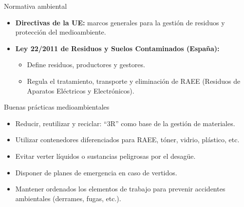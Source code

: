 \documentclass{beamer}
\begin{document}
\begin{frame}{Normativa ambiental}
    \begin{itemize}
        \item \textbf{Directivas de la UE:} marcos generales para la gestión de residuos y protección del medioambiente.
        \item \textbf{Ley 22/2011 de Residuos y Suelos Contaminados (España):}
        \begin{itemize}
            \item Define residuos, productores y gestores.
            \item Regula el tratamiento, transporte y eliminación de RAEE (Residuos de Aparatos Eléctricos y Electrónicos).
        \end{itemize}
    \end{itemize}
\end{frame}

\begin{frame}{Buenas prácticas medioambientales}
    \begin{itemize}
        \item Reducir, reutilizar y reciclar: “3R” como base de la gestión de materiales.
        \item Utilizar contenedores diferenciados para RAEE, tóner, vidrio, plástico, etc.
        \item Evitar verter líquidos o sustancias peligrosas por el desagüe.
        \item Disponer de planes de emergencia en caso de vertidos.
        \item Mantener ordenados los elementos de trabajo para prevenir accidentes ambientales (derrames, fugas, etc.).
    \end{itemize}
\end{frame}
\end{document}
